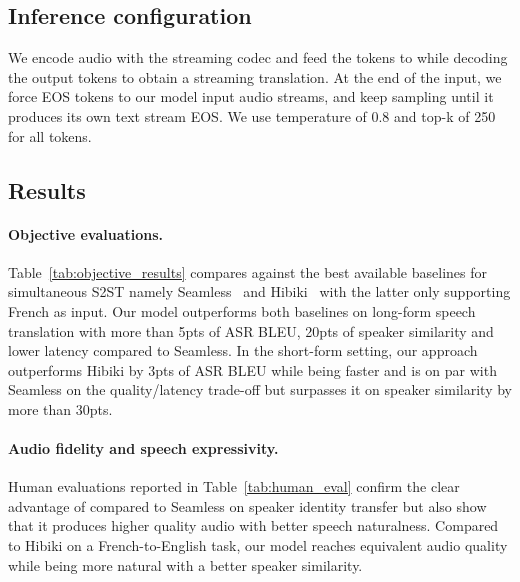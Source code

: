 \subsection{Inference configuration}
\label{inference_config}
We encode audio with the streaming codec and feed the tokens to \ours{} while decoding the output tokens to obtain a streaming translation. At the end of the input, we force EOS tokens to our model input audio streams, and keep sampling until it produces its own text stream EOS. We use temperature of 0.8 and top-k of 250 for all tokens.

\subsection{Results}

\paragraph{Objective evaluations.}
\label{sec:objective_st_results}
Table~\ref{tab:objective_results} compares \ours{} against the best available baselines for simultaneous S2ST namely Seamless~\citep{seamless} and Hibiki~\citep{hibiki} with the latter only supporting French as input. Our model outperforms both baselines on long-form speech translation with more than 5pts of ASR BLEU, 20pts of speaker similarity and lower latency compared to Seamless. In the short-form setting, our approach outperforms Hibiki by 3pts of ASR BLEU while being faster and is on par with Seamless on the quality/latency trade-off but surpasses it on speaker similarity by more than 30pts.

\paragraph{Audio fidelity and speech expressivity.}
\label{sec:human_eval_results}
Human evaluations reported in Table~\ref{tab:human_eval} confirm the clear advantage of \ours{} compared to Seamless on speaker identity transfer but also show that it produces higher quality audio with better speech naturalness. Compared to Hibiki on a French-to-English task, our model reaches equivalent audio quality while being more natural with a better speaker similarity.


